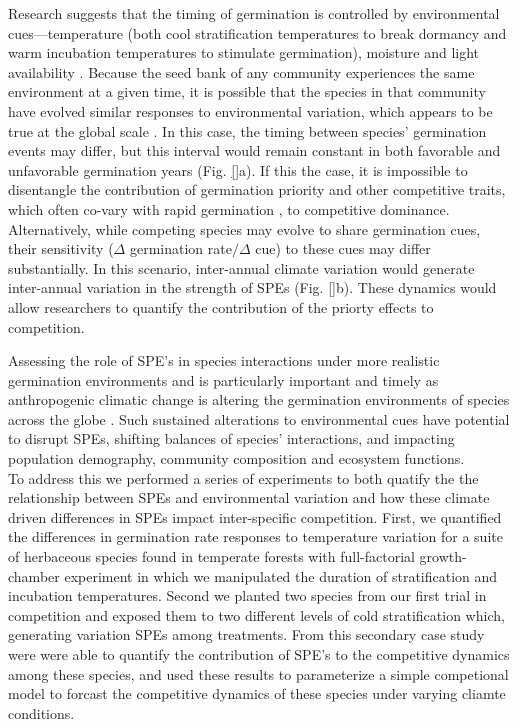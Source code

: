 \documentclass[11pt]{article}\usepackage[]{graphicx}\usepackage[]{color}
\begin{document}
\noindent Research suggests that the timing of germination is controlled by environmental cues---temperature (both cool stratification temperatures to break dormancy and warm incubation temperatures to stimulate germination), moisture and light availability \citep{Bewley1997,Fenner2000}. Because the seed bank of any community experiences the same environment at a given time, it is possible that the species in that community have evolved similar responses to environmental variation, which appears to be true at the global scale \citep{Rubio-de-Casas:2017aa}. In this case, the timing between species' germination events may differ, but this interval would remain constant in both favorable and unfavorable germination years (Fig. \ref{}a). If this the case, it is impossible to disentangle the contribution of germination priority and other competitive traits, which often co-vary with rapid germination \citep{Dickson2012}, to competitive dominance.\\ 

\noindent Alternatively, while competing species may evolve to share germination cues, their sensitivity ($\Delta$ germination rate$/\Delta$ cue) to these cues may differ substantially. In this scenario, inter-annual climate variation would generate inter-annual variation in the strength of SPEs (Fig. \ref{}b). These dynamics would allow researchers to quantify the contribution of the priorty effects to competition. %

\noindent Assessing the role of SPE's in species interactions under more realistic germination environments and is particularly important and timely as anthropogenic climatic change is altering the germination environments of species across the globe \citep{Walck2011}.  Such sustained alterations to environmental cues have potential to disrupt SPEs, shifting balances of species' interactions, and impacting population demography, community composition and ecosystem functions.\\ 

\noindent To address this we performed a series of experiments to both quatify the the relationship between SPEs and environmental variation and how these climate driven differences in SPEs impact inter-specific competition. First, we quantified the differences in germination rate responses to temperature variation for a suite of herbaceous species found in temperate forests with full-factorial growth-chamber experiment in which we manipulated the duration of stratification and incubation temperatures. Second we planted two species from our first trial in competition and exposed them to two different levels of cold stratification which, generating variation SPEs among treatments. From this secondary case study were were able to quantify the contribution of SPE's to the competitive dynamics among these species, and used these results to parameterize a simple competional model to forcast the competitive dynamics of these species under varying cliamte conditions.
\end{document}
